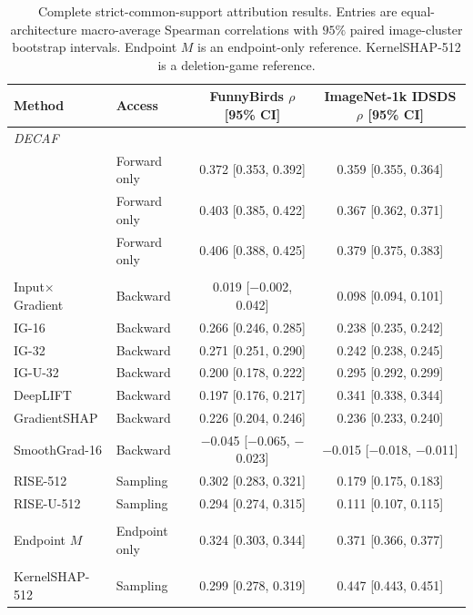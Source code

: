 \begin{table}[t]
\centering
\caption{Complete strict-common-support attribution results. Entries are equal-architecture macro-average Spearman correlations with $95\%$ paired image-cluster bootstrap intervals. Endpoint $M$ is an endpoint-only reference. KernelSHAP-512 is a deletion-game reference.}
\label{tab:forward-attribution-complete}
\footnotesize
\setlength{\tabcolsep}{4.5pt}
\begin{tabular}{llcc}
\toprule
Method & Access & FunnyBirds $\rho$ [95\% CI] & ImageNet-1k IDSDS $\rho$ [95\% CI] \\
\midrule
\multicolumn{4}{l}{\emph{DECAF}} \\
\decaf-3 & Forward only & 0.372 [0.353, 0.392] & 0.359 [0.355, 0.364] \\
\decaf-5 & Forward only & 0.403 [0.385, 0.422] & 0.367 [0.362, 0.371] \\
\decaf-9 & Forward only & 0.406 [0.388, 0.425] & 0.379 [0.375, 0.383] \\
\addlinespace
\multicolumn{4}{l}{\emph{General-purpose attribution}} \\
Input$\times$Gradient & Backward & 0.019 [$-$0.002, 0.042] & 0.098 [0.094, 0.101] \\
IG-16 & Backward & 0.266 [0.246, 0.285] & 0.238 [0.235, 0.242] \\
IG-32 & Backward & 0.271 [0.251, 0.290] & 0.242 [0.238, 0.245] \\
IG-U-32 & Backward & 0.200 [0.178, 0.222] & 0.295 [0.292, 0.299] \\
DeepLIFT & Backward & 0.197 [0.176, 0.217] & 0.341 [0.338, 0.344] \\
GradientSHAP & Backward & 0.226 [0.204, 0.246] & 0.236 [0.233, 0.240] \\
SmoothGrad-16 & Backward & $-$0.045 [$-$0.065, $-$0.023] & $-$0.015 [$-$0.018, $-$0.011] \\
RISE-512 & Sampling & 0.302 [0.283, 0.321] & 0.179 [0.175, 0.183] \\
RISE-U-512 & Sampling & 0.294 [0.274, 0.315] & 0.111 [0.107, 0.115] \\
\addlinespace
\multicolumn{4}{l}{\emph{Endpoint-only reference}} \\
Endpoint $M$ & Endpoint only & 0.324 [0.303, 0.344] & 0.371 [0.366, 0.377] \\
\addlinespace
\multicolumn{4}{l}{\emph{Deletion-game reference}} \\
KernelSHAP-512 & Sampling & 0.299 [0.278, 0.319] & 0.447 [0.443, 0.451] \\
\bottomrule
\end{tabular}
\end{table}

